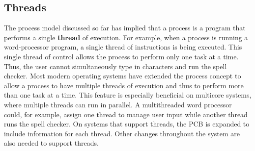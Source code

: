 \subsection*{Threads}\label{sec:3.1:threads}
The process model discussed so far has implied that a process is a program that performs a single \textbf{thread} of execution. For example, when a process is running a word-processor program, a single thread of instructions is being executed. This single thread of control allows the process to perform only one task at a time. Thus, the user cannot simultaneously type in characters and run the spell checker. Most modern operating systems have extended the process concept to allow a process to have multiple threads of execution and thus to perform more than one task at a time. This feature is especially beneficial on multicore systems, where multiple threads can run in parallel. A multithreaded word processor could, for example, assign one thread to manage user input while another thread runs the spell checker. On systems that support threads, the PCB is expanded to include information for each thread. Other changes throughout the system are also needed to support threads.

